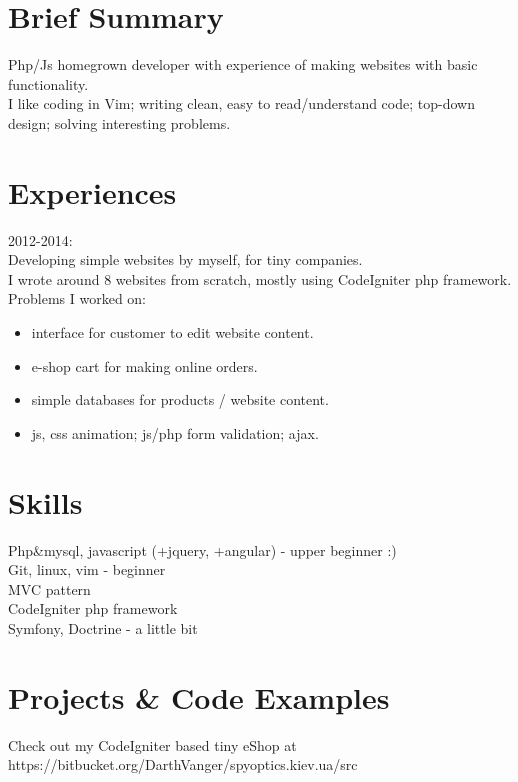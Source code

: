 \documentclass[a4paper, 14pt]{article}
\begin{document}
\begin{center}
	\textsc{\Huge{}}
\end{center}

\section{Brief Summary}
	Php/Js homegrown developer with experience of making websites with basic functionality. \\
	I like coding in Vim; writing clean, easy to read/understand code; top-down design; solving interesting problems.
\section{Experiences}
	2012-2014:\\
	Developing simple websites by myself, for tiny companies. \\
	I wrote around 8 websites from scratch, mostly using CodeIgniter php framework. \\
	Problems I worked on: \\
	\vspace{-1.5em}
	\begin{itemize}
		\item interface for customer to edit website content.\\
		\item e-shop cart for making online orders.\\
		\item simple databases for products / website content. \\
		\item js, css animation; js/php form validation; ajax.
	\end{itemize}
\section{Skills}
	Php\&mysql, javascript (+jquery, +angular) - upper beginner :) \\
	Git, linux, vim - beginner \\
	MVC pattern \\
  CodeIgniter php framework \\
  Symfony, Doctrine - a little bit \\
\section{Projects \& Code Examples}
	Check out my CodeIgniter based tiny eShop at \\
    https://bitbucket.org/DarthVanger/spyoptics.kiev.ua/src
\end{document}
